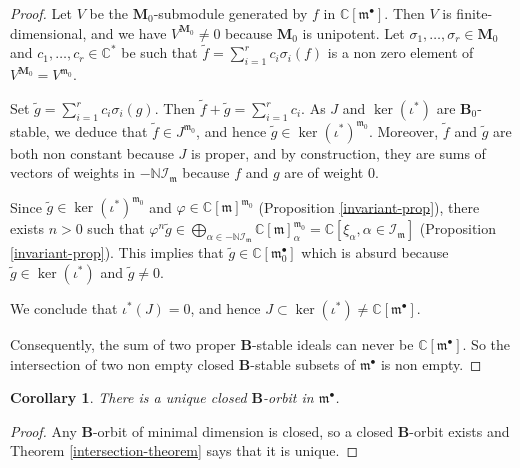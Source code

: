 \documentclass{amsart}
\newtheorem{corollary}[theorem]{Corollary}
\theoremstyle{definition}
\theoremstyle{remark}
\numberwithin{equation}{section}
\newcommand{\soc}[1]{\mathcal{I}_{#1}}
\newcommand{\group}[1]{\mathbf{#1}}
\begin{document}
\begin{proof}
Let $V$ be the $\group{M}_{0}$-submodule generated by $f$ in $\mathbb{C}[\mathfrak{m}^{\bullet} ]$. 
Then $V$ is finite-dimensional, and we have $V^{\group{M}_{0}}\neq 0$ because $\group{M}_{0}$ is unipotent. 
Let $\sigma_{1},\dots ,\sigma_{r}\in \group{M}_{0}$ and $c_{1},\dots ,c_{r}\in \mathbb{C}^{*}$
be such that 
$\tilde{f} = \sum_{i=1}^{r} c_{i}\sigma_{i}( f )$ is a non zero element of $V^{\group{M}_{0}}= V^{\mathfrak{m}_{0}}$.

Set $\tilde{g} = \sum_{i=1}^{r} c_{i}\sigma_{i}( g)$. Then $\tilde{f} + \tilde{g} = \sum_{i=1}^{r} c_{i}$.
As $J$ and $\ker (\iota^{*})$ are $\group{B}_{0}$-stable, we deduce that $\tilde{f} \in J^{\mathfrak{m}_{0}}$, and 
hence $\tilde{g}\in \ker (\iota^{*})^{\mathfrak{m}_{0}}$. Moreover,  $\tilde{f}$ and $\tilde{g}$ are both non constant
because $J$ is proper, and by construction, they are sums of vectors of weights
in $-\mathbb{N}\soc{\mathfrak{m}}$ because $f$ and $g$ are of weight $0$. 

Since $\tilde{g}\in \ker (\iota^{*})^{\mathfrak{m}_{0}}$ and 
$\varphi \in \mathbb{C}[\mathfrak{m}]^{\mathfrak{m}_{0}}$
(Proposition \ref{invariant-prop}), there exists $n>0$ such that $\varphi^{n}\tilde{g}\in 
\bigoplus_{\alpha\in -\mathbb{N}\soc{\mathfrak{m}}} \mathbb{C}[\mathfrak{m}]_{\alpha}^{\mathfrak{m}_{0}}
=\mathbb{C}[\xi_{\alpha} , \alpha\in \soc{\mathfrak{m}}]$ (Proposition \ref{invariant-prop}). 
This implies that $\tilde{g}\in \mathbb{C}[\mathfrak{m}_{0}^{\bullet}]$ which is absurd because $\tilde{g}\in
\ker (\iota^{*})$ and $\tilde{g}\neq 0$. 

We conclude that $\iota^{*}( J) = 0$, and hence $J \subset \ker (\iota^{*}) \neq \mathbb{C}[\mathfrak{m}^{\bullet}]$.

Consequently, the sum of two proper $\group{B}$-stable ideals can never be $\mathbb{C}[\mathfrak{m}^{\bullet}]$.
So the intersection of two non empty closed $\group{B}$-stable subsets of $\mathfrak{m}^{\bullet}$ is 
non empty.
\end{proof}

\begin{corollary}\label{main-corollary}
There is a unique closed $\group{B}$-orbit in $\mathfrak{m}^{\bullet}$.
\end{corollary}
\begin{proof}
Any $\group{B}$-orbit of minimal dimension is closed, so a closed $\group{B}$-orbit exists and
Theorem \ref{intersection-theorem} says that it is unique. 
\end{proof}
\end{document}
